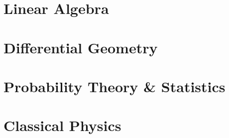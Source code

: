 \documentclass[12pt, a4paper]{report}
\begin{document}







\part{Linear Algebra}
\parttoc









\part{Differential Geometry}\label{part:diffgeom}
\parttoc

















\part{Probability Theory \& Statistics}
\parttoc









\part{Classical Physics}
\parttoc





\end{document}
